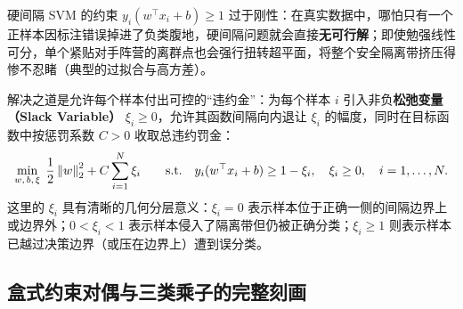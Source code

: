硬间隔 SVM 的约束 $y_i(w^\top x_i + b) \ge 1$ 过于刚性：在真实数据中，哪怕只有一个正样本因标注错误掉进了负类腹地，硬间隔问题就会直接\textbf{无可行解}；即使勉强线性可分，单个紧贴对手阵营的离群点也会强行扭转超平面，将整个安全隔离带挤压得惨不忍睹（典型的过拟合与高方差）。

解决之道是允许每个样本付出可控的“违约金”：为每个样本 $i$ 引入非负\textbf{松弛变量（Slack Variable）} $\xi_i \ge 0$，允许其函数间隔向内退让 $\xi_i$ 的幅度，同时在目标函数中按惩罚系数 $C > 0$ 收取总违约罚金：
\begin{equation}\label{eq:svm-soft-primal}
  \min_{w,\, b,\, \xi}\; \frac{1}{2}\left\|w\right\|_2^2 + C\sum_{i=1}^{N} \xi_i
  \qquad \text{s.t.}\quad y_i(w^\top x_i + b) \ge 1 - \xi_i,\quad \xi_i \ge 0,\quad i = 1,\dots,N.
\end{equation}
这里的 $\xi_i$ 具有清晰的几何分层意义：$\xi_i = 0$ 表示样本位于正确一侧的间隔边界上或边界外；$0 < \xi_i < 1$ 表示样本侵入了隔离带但仍被正确分类；$\xi_i \ge 1$ 则表示样本已越过决策边界（或压在边界上）遭到误分类。

\subsection{盒式约束对偶与三类乘子的完整刻画}

